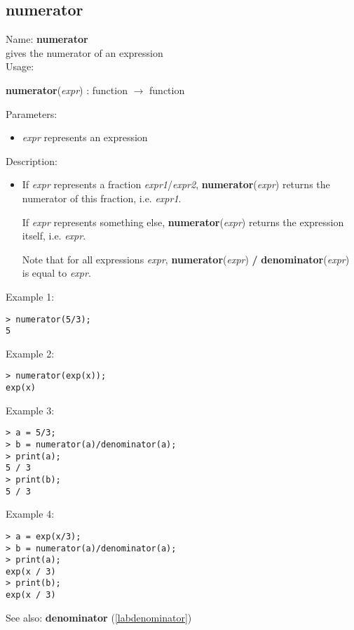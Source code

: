 \subsection{numerator}
\label{labnumerator}
\noindent Name: \textbf{numerator}\\
gives the numerator of an expression\\
\noindent Usage: 
\begin{center}
\textbf{numerator}(\emph{expr}) : \textsf{function} $\rightarrow$ \textsf{function}
\\ 
\end{center}
Parameters: 
\begin{itemize}
\item \emph{expr} represents an expression
\end{itemize}
\noindent Description: \begin{itemize}

\item If \emph{expr} represents a fraction \emph{expr1}/\emph{expr2}, \textbf{numerator}(\emph{expr})
   returns the numerator of this fraction, i.e. \emph{expr1}.
    
   If \emph{expr} represents something else, \textbf{numerator}(\emph{expr}) 
   returns the expression itself, i.e. \emph{expr}.
    
   Note that for all expressions \emph{expr}, \textbf{numerator}(\emph{expr}) \textbf{/} \textbf{denominator}(\emph{expr})
   is equal to \emph{expr}.
\end{itemize}
\noindent Example 1: 
\begin{center}\begin{minipage}{15cm}\begin{Verbatim}[frame=single]
> numerator(5/3);
5
\end{Verbatim}
\end{minipage}\end{center}
\noindent Example 2: 
\begin{center}\begin{minipage}{15cm}\begin{Verbatim}[frame=single]
> numerator(exp(x));
exp(x)
\end{Verbatim}
\end{minipage}\end{center}
\noindent Example 3: 
\begin{center}\begin{minipage}{15cm}\begin{Verbatim}[frame=single]
> a = 5/3;
> b = numerator(a)/denominator(a);
> print(a);
5 / 3
> print(b);
5 / 3
\end{Verbatim}
\end{minipage}\end{center}
\noindent Example 4: 
\begin{center}\begin{minipage}{15cm}\begin{Verbatim}[frame=single]
> a = exp(x/3);
> b = numerator(a)/denominator(a);
> print(a);
exp(x / 3)
> print(b);
exp(x / 3)
\end{Verbatim}
\end{minipage}\end{center}
See also: \textbf{denominator} (\ref{labdenominator})
